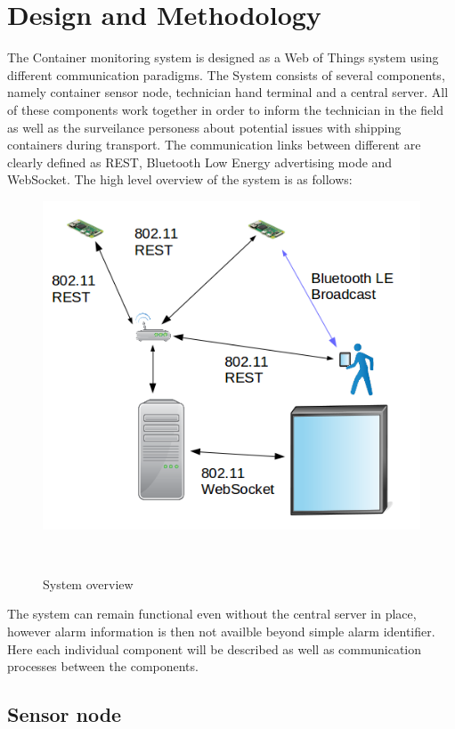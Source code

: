 \chapter{Design and Methodology}
\label{cha:design-and-method}


The Container monitoring system is designed as a Web of Things system using different communication paradigms. The System consists of several components, namely container sensor node, technician hand terminal and a central server. All of these components work together in order to inform the technician in the field as well as the surveilance personess about potential issues with shipping containers during transport. The communication links between different are clearly defined as REST, Bluetooth Low Energy advertising mode and WebSocket. The high level overview of the system is as follows:

\bigskip
\begin{figure}[H]
\centering
\includegraphics[scale=0.5]{gfx/overview} 
\caption{System overview}~\label{fig:overview}
\end{figure}

The system can remain functional even without the central server in place, however alarm information is then not availble beyond simple alarm identifier. Here each individual component will be described as well as communication processes between the components.

\section{Sensor node}
\label{sec:sensor}

